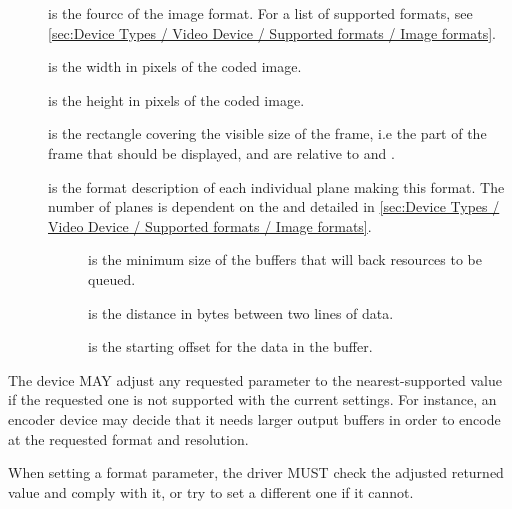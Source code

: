 \begin{description}
\item[]
is the fourcc of the image format. For a list of supported formats, see
\ref{sec:Device Types / Video Device / Supported formats / Image formats}.
\item[]
is the width in pixels of the coded image.
\item[]
is the height in pixels of the coded image.
\item[]
is the rectangle covering the visible size of the frame, i.e the part of
the frame that should be displayed,  and  are
relative to  and .
\item[]
is the format description of each individual plane making this format.
The number of planes is dependent on the  and detailed in
\ref{sec:Device Types / Video Device / Supported formats / Image formats}.

\begin{description}
\item[]
is the minimum size of the buffers that will back resources to be
queued.
\item[]
is the distance in bytes between two lines of data.
\item[]
is the starting offset for the data in the buffer.
\end{description}
\end{description}


The device MAY adjust any requested parameter to the nearest-supported
value if the requested one is not supported with the current settings.
For instance, an encoder device may decide that it needs larger output
buffers in order to encode at the requested format and resolution.


When setting a format parameter, the driver MUST check the adjusted
returned value and comply with it, or try to set a different one if it
cannot.

